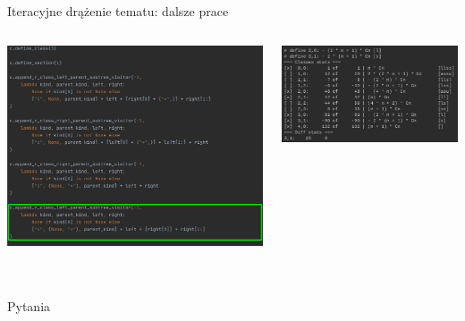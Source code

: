 \documentclass[final]{beamer}
\theoremstyle{bluetheorem}
\theoremstyle{bluetheorem}
\theoremstyle{greentheorem}
\begin{document}
\begin{frame}{Iteracyjne drążenie tematu: dalsze prace}
    \begin{columns}
        \begin{block}{}
            \begin{center}
                \includegraphics[width=\textwidth]{framework_012.png}
            \end{center}
        \end{block}

        \begin{block}{}
            \begin{center}
                \includegraphics[width=\textwidth]{framework_014.png}
            \end{center}
        \end{block}
    \end{columns}
\end{frame}


\section*{}

\begin{frame}{Pytania}
\end{frame}
\end{document}
